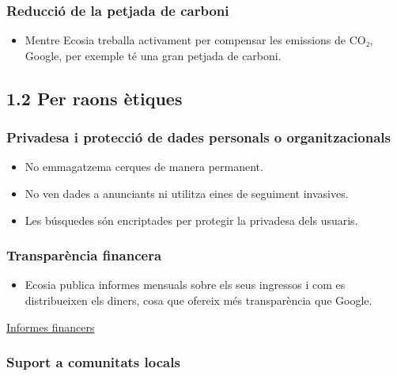 \documentclass[
  a4paper,
]{article}
\providecommand{\tightlist}{%
  \setlength{\itemsep}{0pt}\setlength{\parskip}{0pt}}
\begin{document}
\subsubsection{Reducció de la petjada de
carboni}\label{reducciuxf3-de-la-petjada-de-carboni}

\begin{itemize}
\tightlist
\item
  Mentre Ecosia treballa activament per compensar les emissions de CO₂,
  Google, per exemple té una gran petjada de carboni.
\end{itemize}

\subsection{1.2 Per raons ètiques}\label{per-raons-uxe8tiques}

\subsubsection{Privadesa i protecció de dades personals o
organitzacionals}\label{privadesa-i-protecciuxf3-de-dades-personals-o-organitzacionals}

\begin{itemize}
\tightlist
\item
  No emmagatzema cerques de manera permanent.
\item
  No ven dades a anunciants ni utilitza eines de seguiment invasives.
\item
  Les búsquedes són encriptades per protegir la privadesa dels usuaris.
\end{itemize}

\subsubsection{Transparència
financera}\label{transparuxe8ncia-financera}

\begin{itemize}
\tightlist
\item
  Ecosia publica informes mensuals sobre els seus ingressos i com es
  distribueixen els diners, cosa que ofereix més transparència que
  Google.
\end{itemize}

\href{https://ecosia.helpscoutdocs.com/article/402-reports-transparency}{Informes
financers}

\subsubsection{Suport a comunitats
locals}\label{suport-a-comunitats-locals}
\end{document}
